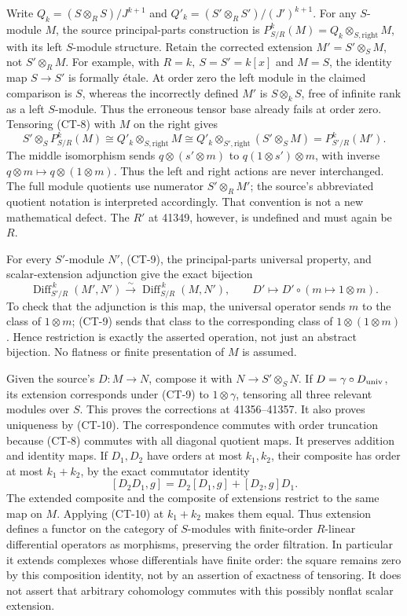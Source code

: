 Write \(Q_k=(S\otimes_RS)/J^{k+1}\) and \(Q'_k=(S'\otimes_RS')/(J')^{k+1}\). For any \(S\)-module \(M\), the source principal-parts construction is \(P^k_{S/R}(M)=Q_k\otimes_{S,\mathrm{right}}M\), with its left \(S\)-module structure. Retain the corrected extension \(M'=S'\otimes_SM\), not \(S'\otimes_RM\). For example, with \(R=k,\ S=S'=k[x]\) and \(M=S\), the identity map \(S\to S'\) is formally étale. At order zero the left module in the claimed comparison is \(S\), whereas the incorrectly defined \(M'\) is \(S\otimes_kS\), free of infinite rank as a left \(S\)-module. Thus the erroneous tensor base already fails at order zero. Tensoring (CT-8) with \(M\) on the right gives \[
S'\otimes_S P^k_{S/R}(M)
\cong Q'_k\otimes_{S,\mathrm{right}}M
\cong Q'_k\otimes_{S',\mathrm{right}}(S'\otimes_SM)
=P^k_{S'/R}(M').
\tag{CT-9}
\] The middle isomorphism sends \(q\otimes(s'\otimes m)\) to \(q(1\otimes s')\otimes m\), with inverse \(q\otimes m\mapsto
q\otimes(1\otimes m)\). Thus the left and right actions are never interchanged. The full module quotients use numerator \(S'\otimes_RM'\); the source's abbreviated quotient notation is interpreted accordingly. That convention is not a new mathematical defect. The \(R'\) at 41349, however, is undefined and must again be \(R\).

For every \(S'\)-module \(N'\), (CT-9), the principal-parts universal property, and scalar-extension adjunction give the exact bijection \[
\operatorname{Diff}^{\,k}_{S'/R}(M',N')
\xrightarrow{\sim}\operatorname{Diff}^{\,k}_{S/R}(M,N'),
\qquad D'\longmapsto D'\circ(m\mapsto1\otimes m).
\tag{CT-10}
\] To check that the adjunction is this map, the universal operator sends \(m\) to the class of \(1\otimes m\); (CT-9) sends that class to the corresponding class of \(1\otimes(1\otimes m)\). Hence restriction is exactly the asserted operation, not just an abstract bijection. No flatness or finite presentation of \(M\) is assumed.

Given the source's \(D:M\to N\), compose it with \(N\to S'\otimes_SN\). If \(D=\gamma\circ D_{\rm univ}\), its extension corresponds under (CT-9) to \(1\otimes\gamma\), tensoring all three relevant modules over \(S\). This proves the corrections at 41356--41357. It also proves uniqueness by (CT-10). The correspondence commutes with order truncation because (CT-8) commutes with all diagonal quotient maps. It preserves addition and identity maps. If \(D_1,D_2\) have orders at most \(k_1,k_2\), their composite has order at most \(k_1+k_2\), by the exact commutator identity \[
[D_2D_1,g]=D_2[D_1,g]+[D_2,g]D_1.
\] The extended composite and the composite of extensions restrict to the same map on \(M\). Applying (CT-10) at \(k_1+k_2\) makes them equal. Thus extension defines a functor on the category of \(S\)-modules with finite-order \(R\)-linear differential operators as morphisms, preserving the order filtration. In particular it extends complexes whose differentials have finite order: the square remains zero by this composition identity, not by an assertion of exactness of tensoring. It does not assert that arbitrary cohomology commutes with this possibly nonflat scalar extension.

